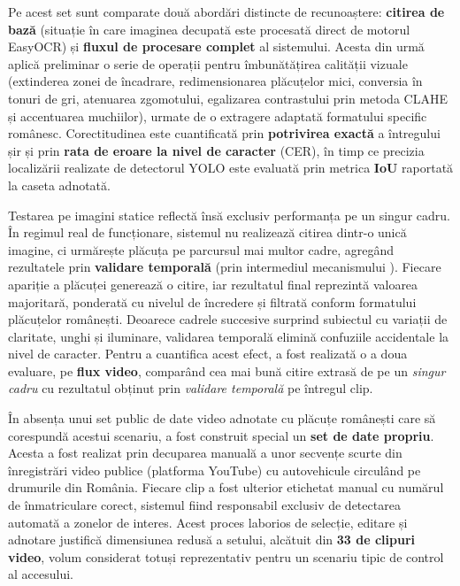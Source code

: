 \documentclass[../../main.tex]{subfiles}
\begin{document}
Pe acest set sunt comparate două abordări distincte de recunoaștere: \textbf{citirea de bază} (situație în care imaginea decupată este procesată direct de motorul EasyOCR) și \textbf{fluxul de procesare complet} al sistemului. Acesta din urmă aplică preliminar o serie de operații pentru îmbunătățirea calității vizuale (extinderea zonei de încadrare, redimensionarea plăcuțelor mici, conversia în tonuri de gri, atenuarea zgomotului, egalizarea contrastului prin metoda CLAHE și accentuarea muchiilor), urmate de o extragere adaptată formatului specific românesc. Corectitudinea este cuantificată prin \textbf{potrivirea exactă} a întregului șir și prin \textbf{rata de eroare la nivel de caracter} (CER), în timp ce precizia localizării realizate de detectorul YOLO este evaluată prin metrica \textbf{IoU} raportată la caseta adnotată.

Testarea pe imagini statice reflectă însă exclusiv performanța pe un singur cadru. În regimul real de funcționare, sistemul nu realizează citirea dintr-o unică imagine, ci urmărește plăcuța pe parcursul mai multor cadre, agregând rezultatele prin \textbf{validare temporală} (prin intermediul mecanismului ). Fiecare apariție a plăcuței generează o citire, iar rezultatul final reprezintă valoarea majoritară, ponderată cu nivelul de încredere și filtrată conform formatului plăcuțelor românești. Deoarece cadrele succesive surprind subiectul cu variații de claritate, unghi și iluminare, validarea temporală elimină confuziile accidentale la nivel de caracter. Pentru a cuantifica acest efect, a fost realizată o a doua evaluare, pe \textbf{flux video}, comparând cea mai bună citire extrasă de pe un \textit{singur cadru} cu rezultatul obținut prin \textit{validare temporală} pe întregul clip.

În absența unui set public de date video adnotate cu plăcuțe românești care să corespundă acestui scenariu, a fost construit special un \textbf{set de date propriu}. Acesta a fost realizat prin decuparea manuală a unor secvențe scurte din înregistrări video publice (platforma YouTube) cu autovehicule circulând pe drumurile din România. Fiecare clip a fost ulterior etichetat manual cu numărul de înmatriculare corect, sistemul fiind responsabil exclusiv de detectarea automată a zonelor de interes. Acest proces laborios de selecție, editare și adnotare justifică dimensiunea redusă a setului, alcătuit din \textbf{33 de clipuri video}, volum considerat totuși reprezentativ pentru un scenariu tipic de control al accesului.
\end{document}
